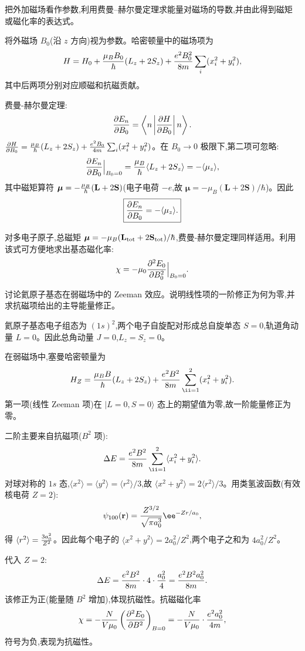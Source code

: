 \begin{question}
把外加磁场看作参数,利用费曼--赫尔曼定理求能量对磁场的导数,并由此得到磁矩或磁化率的表达式。
\begin{solution}
将外磁场 $B_0$(沿 $z$ 方向)视为参数。哈密顿量中的磁场项为
\[
H = H_0 + {\mu_B B_0\over\hbar}(L_z+2S_z) + {e^2B_0^2\over8m}\sum_i(x_i^2+y_i^2),
\]
其中后两项分别对应顺磁和抗磁贡献。

费曼-赫尔曼定理:
\[
{\partial E_n\over\partial B_0}
= \left\langle n\left| {\partial H\over\partial B_0} \right| n \right\rangle.
\]
${\partial H\over\partial B_0} = {\mu_B\over\hbar}(L_z+2S_z) + {e^2B_0\over4m}\sum_i(x_i^2+y_i^2)$。在 $B_0\to0$ 极限下,第二项可忽略:
\[
{\partial E_n\over\partial B_0}\Big|_{B_0=0}
= {\mu_B\over\hbar}\langle L_z+2S_z\rangle
= -\langle \mu_z\rangle,
\]
其中磁矩算符 $\boldsymbol\mu = -{\mu_B\over\hbar}(\mathbf L + 2\mathbf S)$(电子电荷 $-e$,故 $\boldsymbol\mu = -\mu_B(\mathbf L+2\mathbf S)/\hbar$)。因此
\[
\boxed{{\partial E_n\over\partial B_0} = -\langle\mu_z\rangle.}
\]

对多电子原子,总磁矩 $\boldsymbol\mu = -\mu_B(\mathbf L_{\rm tot}+2\mathbf S_{\rm tot})/\hbar$,费曼-赫尔曼定理同样适用。利用该式可方便地求出基态磁化率:
\[
\chi = -\mu_0{\partial^2 E_0\over\partial B_0^2}\Big|_{B_0=0}.
\]
\end{solution}
\end{question}

\begin{question}
讨论氦原子基态在弱磁场中的 Zeeman 效应。说明线性项的一阶修正为何为零,并求抗磁项给出的主导能量修正。
\begin{solution}
氦原子基态电子组态为 $(1s)^2$,两个电子自旋配对形成总自旋单态 $S=0$,轨道角动量 $L=0$。因此总角动量 $J=0$,$L_z=S_z=0$。

在弱磁场中,塞曼哈密顿量为
\[
H_Z = {\mu_B B\over\hbar}(L_z+2S_z) + {e^2B^2\over8m}\sum_{\ii=1}^2(x_i^2+y_i^2).
\]
第一项(线性 Zeeman 项)在 $|L=0,S=0\rangle$ 态上的期望值为零,故一阶能量修正为零。

二阶主要来自抗磁项($B^2$ 项):
\[
\Delta E = {e^2B^2\over8m}\sum_{\ii=1}^2\langle x_i^2+y_i^2\rangle.
\]
对球对称的 $1s$ 态,$\langle x^2\rangle = \langle y^2\rangle = \langle r^2\rangle/3$,故 $\langle x^2+y^2\rangle = 2\langle r^2\rangle/3$。用类氢波函数(有效核电荷 $Z=2$):
\[
\psi_{100}(\mathbf r) = {Z^{3/2}\over\sqrt{\pi a_0^3}}\ee^{-Zr/a_0},
\]
得 $\langle r^2\rangle = {3a_0^2\over Z^2}$。因此每个电子的 $\langle x^2+y^2\rangle = 2a_0^2/Z^2$,两个电子之和为 $4a_0^2/Z^2$。

代入 $Z=2$:
\[
\Delta E = {e^2B^2\over8m}\cdot 4\cdot {a_0^2\over 4} = {e^2B^2 a_0^2\over8m}.
\]
该修正为正(能量随 $B^2$ 增加),体现抗磁性。抗磁磁化率
\[
\chi = -{N\over V\mu_0}\left({\partial^2 E_0\over\partial B^2}\right)_{B=0}
= -{N\over V\mu_0}\cdot{e^2a_0^2\over4m},
\]
符号为负,表现为抗磁性。
\end{solution}
\end{question}

